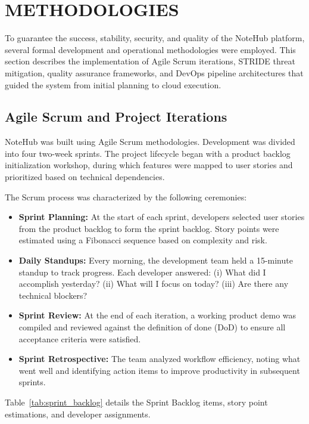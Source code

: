 \documentclass[12,Times new Roman,a4paper]{report}
\begin{document}
\newpage
\section{METHODOLOGIES}

To guarantee the success, stability, security, and quality of the NoteHub platform, several formal development and operational methodologies were employed. This section describes the implementation of Agile Scrum iterations, STRIDE threat mitigation, quality assurance frameworks, and DevOps pipeline architectures that guided the system from initial planning to cloud execution.

\subsection{Agile Scrum and Project Iterations}

NoteHub was built using Agile Scrum methodologies. Development was divided into four two-week sprints. The project lifecycle began with a product backlog initialization workshop, during which features were mapped to user stories and prioritized based on technical dependencies. 

The Scrum process was characterized by the following ceremonies:
\begin{itemize}
    \item \textbf{Sprint Planning:} At the start of each sprint, developers selected user stories from the product backlog to form the sprint backlog. Story points were estimated using a Fibonacci sequence based on complexity and risk.
    \item \textbf{Daily Standups:} Every morning, the development team held a 15-minute standup to track progress. Each developer answered: (i) What did I accomplish yesterday? (ii) What will I focus on today? (iii) Are there any technical blockers?
    \item \textbf{Sprint Review:} At the end of each iteration, a working product demo was compiled and reviewed against the definition of done (DoD) to ensure all acceptance criteria were satisfied.
    \item \textbf{Sprint Retrospective:} The team analyzed workflow efficiency, noting what went well and identifying action items to improve productivity in subsequent sprints.
\end{itemize}

Table~\ref{tab:sprint_backlog} details the Sprint Backlog items, story point estimations, and developer assignments.
\end{document}
